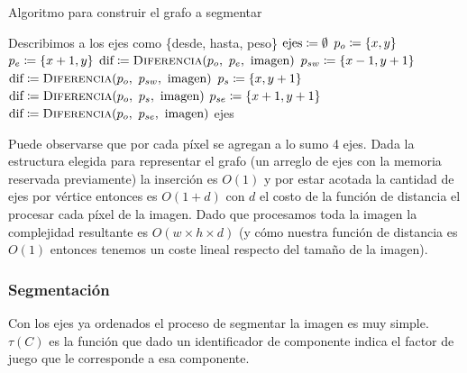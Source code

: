 \begin{algorithm}[H]
\caption{Algoritmo para construir el grafo a segmentar}
\begin{algorithmic}[1]
\Statex{}
	\Statex{} \Comment{} Describimos a los ejes como \{desde, hasta, peso\}
	\State{} $\text{ejes} \coloneqq \emptyset$
			\State{} $p_o \coloneqq \{x, y\}$
			\State{} $p_e \coloneqq \{x + 1, y\}$
				\State{} $\text{dif}
					\is \Call{Diferencia}{p_o,\ p_e,\ \text{imagen}}$
				\State{} 
			\EndIf{}
			\State{} $p_{sw} \coloneqq \{x - 1, y + 1\}$
				\State{} $\text{dif}
					\is \Call{Diferencia}{p_o,\ p_{sw},\ \text{imagen}}$
				\State{} 
			\EndIf{}
			\State{} $p_s \coloneqq \{x, y + 1\}$
				\State{} $\text{dif}
					\is \Call{Diferencia}{p_o,\ p_s,\ \text{imagen}}$
				\State{} 
			\EndIf{}
			\State{} $p_{se} \coloneqq \{x + 1, y + 1\}$
				\State{} $\text{dif}
					\is \Call{Diferencia}{p_o,\ p_{se},\ \text{imagen}}$
				\State{} 
			\EndIf{}
		\EndFor{}
	\EndFor{}
	\State{} \Return{} ejes
\EndFunction{}
\end{algorithmic}
\end{algorithm}

Puede observarse que por cada píxel se agregan a lo sumo 4 ejes. Dada la
estructura elegida para representar el grafo (un arreglo de ejes con la memoria
reservada previamente) la inserción es $O(1)$ y por estar acotada la cantidad
de ejes por vértice entonces es $O(1 + d)$ con $d$ el costo de la función de
distancia el procesar cada píxel de la imagen. Dado que procesamos toda la
imagen la complejidad resultante es $O(w \times h \times d)$ (y cómo nuestra
función de distancia es $O(1)$ entonces tenemos un coste lineal respecto del
tamaño de la imagen).

\subsubsection{Segmentación}

Con los ejes ya ordenados el proceso de segmentar la imagen es muy simple.
$\tau(C)$ es la función que dado un identificador de componente indica el
factor de juego que le corresponde a esa componente.

